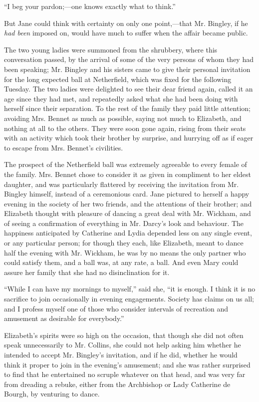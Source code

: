 \documentclass[12pt,openright]{book}
\begin{document}
“I beg your pardon;—one knows exactly what to think.”

But Jane could think with certainty on only one point,—that Mr. Bingley, if he \textit{had been} imposed on, would have much to suffer when the affair became public.

The two young ladies were summoned from the shrubbery, where this conversation passed, by the arrival of some of the very persons of whom they had been speaking; Mr. Bingley and his sisters came to give their personal invitation for the long expected ball at Netherfield, which was fixed for the following Tuesday. The two ladies were delighted to see their dear friend again, called it an age since they had met, and repeatedly asked what she had been doing with herself since their separation. To the rest of the family they paid little attention; avoiding Mrs. Bennet as much as possible, saying not much to Elizabeth, and nothing at all to the others. They were soon gone again, rising from their seats with an activity which took their brother by surprise, and hurrying off as if eager to escape from Mrs. Bennet’s civilities.

The prospect of the Netherfield ball was extremely agreeable to every female of the family. Mrs. Bennet chose to consider it as given in compliment to her eldest daughter, and was particularly flattered by receiving the invitation from Mr. Bingley himself, instead of a ceremonious card. Jane pictured to herself a happy evening in the society of her two friends, and the attentions of their brother; and Elizabeth thought with pleasure of dancing a great deal with Mr. Wickham, and of seeing a confirmation of everything in Mr. Darcy’s look and behaviour. The happiness anticipated by Catherine and Lydia depended less on any single event, or any particular person; for though they each, like Elizabeth, meant to dance half the evening with Mr. Wickham, he was by no means the only partner who could satisfy them, and a ball was, at any rate, a ball. And even Mary could assure her family that she had no disinclination for it.

“While I can have my mornings to myself,” said she, “it is enough. I think it is no sacrifice to join occasionally in evening engagements. Society has claims on us all; and I profess myself one of those who consider intervals of recreation and amusement as desirable for everybody.”

Elizabeth’s spirits were so high on the occasion, that though she did not often speak unnecessarily to Mr. Collins, she could not help asking him whether he intended to accept Mr. Bingley’s invitation, and if he did, whether he would think it proper to join in the evening’s amusement; and she was rather surprised to find that he entertained no scruple whatever on that head, and was very far from dreading a rebuke, either from the Archbishop or Lady Catherine de Bourgh, by venturing to dance.
\end{document}
